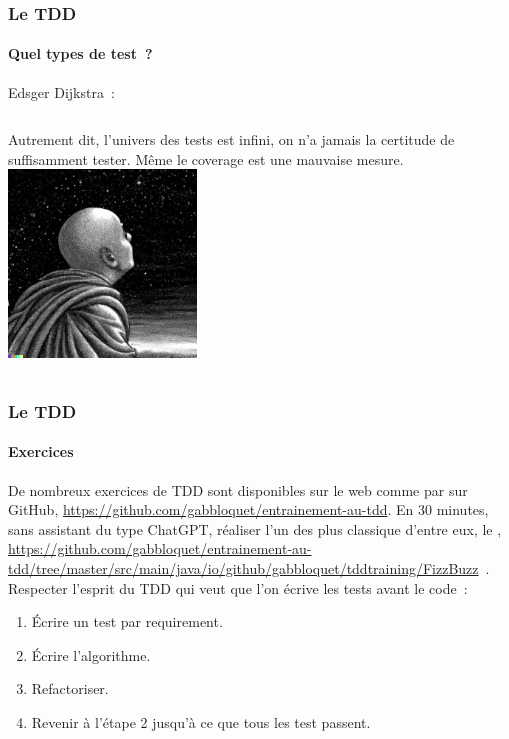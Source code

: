 \documentclass{beamer}
\begin{document}
    \begin{frame}
        \transdissolve
        \frametitle{Le TDD}
        \framesubtitle{Quel types de test~?}
        Edsger Dijkstra~: 
        \bigbreak
        \begin{columns}
            Autrement dit, l'univers des tests est infini, on n'a jamais la certitude de suffisamment tester.
            \bigbreak
            Même le coverage est une mauvaise mesure.
            \centering
            \includegraphics[width=5cm]{image/monk-looking-the-deepness-of-the-stars-in-the-night-sky}
        \end{columns}
    \end{frame}

    \begin{frame}
        \transdissolve
        \frametitle{Le TDD}
        \framesubtitle{Exercices \execcounterdispinc{}}
        De nombreux exercices de TDD sont disponibles sur le web comme par sur GitHub, \url{https://github.com/gabbloquet/entrainement-au-tdd}.
        \bigbreak
        En 30 minutes, sans assistant du type ChatGPT, réaliser l'un des plus classique d'entre eux, le , \url{https://github.com/gabbloquet/entrainement-au-tdd/tree/master/src/main/java/io/github/gabbloquet/tddtraining/FizzBuzz}~.
        Respecter l'esprit du TDD qui veut que l'on écrive les tests avant le code~:
        \begin{enumerate}
            \item Écrire un test par requirement.
            \item Écrire l'algorithme.
            \item Refactoriser.
            \item Revenir à l'étape 2 jusqu'à ce que tous les test passent.
        \end{enumerate}
    \end{frame}
\end{document}
